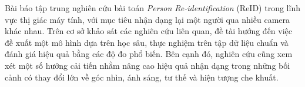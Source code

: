 Bài báo tập trung nghiên cứu bài toán \textit{Person Re-identification} (ReID)
trong lĩnh vực thị giác máy tính, với mục tiêu nhận dạng lại một người qua
nhiều camera khác nhau. Trên cơ sở khảo sát các nghiên cứu liên quan, đề tài
hướng đến việc đề xuất một mô hình dựa trên học sâu, thực nghiệm trên tập dữ
liệu chuẩn và đánh giá hiệu quả bằng các độ đo phổ biến. Bên cạnh đó, nghiên
cứu cũng xem xét một số hướng cải tiến nhằm nâng cao hiệu quả nhận dạng trong
những bối cảnh có thay đổi lớn về góc nhìn, ánh sáng, tư thế và hiện tượng che
khuất.
